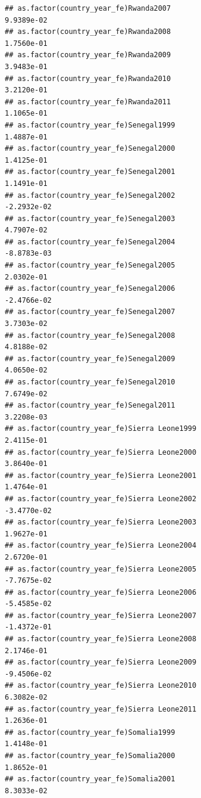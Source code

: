 \documentclass[
  a4paper,
]{article}
\begin{document}
\begin{verbatim}
## as.factor(country_year_fe)Rwanda2007                            9.9389e-02
## as.factor(country_year_fe)Rwanda2008                            1.7560e-01
## as.factor(country_year_fe)Rwanda2009                            3.9483e-01
## as.factor(country_year_fe)Rwanda2010                            3.2120e-01
## as.factor(country_year_fe)Rwanda2011                            1.1065e-01
## as.factor(country_year_fe)Senegal1999                           1.4887e-01
## as.factor(country_year_fe)Senegal2000                           1.4125e-01
## as.factor(country_year_fe)Senegal2001                           1.1491e-01
## as.factor(country_year_fe)Senegal2002                          -2.2932e-02
## as.factor(country_year_fe)Senegal2003                           4.7907e-02
## as.factor(country_year_fe)Senegal2004                          -8.8783e-03
## as.factor(country_year_fe)Senegal2005                           2.0302e-01
## as.factor(country_year_fe)Senegal2006                          -2.4766e-02
## as.factor(country_year_fe)Senegal2007                           3.7303e-02
## as.factor(country_year_fe)Senegal2008                           4.8188e-02
## as.factor(country_year_fe)Senegal2009                           4.0650e-02
## as.factor(country_year_fe)Senegal2010                           7.6749e-02
## as.factor(country_year_fe)Senegal2011                           3.2208e-03
## as.factor(country_year_fe)Sierra Leone1999                      2.4115e-01
## as.factor(country_year_fe)Sierra Leone2000                      3.8640e-01
## as.factor(country_year_fe)Sierra Leone2001                      1.4764e-01
## as.factor(country_year_fe)Sierra Leone2002                     -3.4770e-02
## as.factor(country_year_fe)Sierra Leone2003                      1.9627e-01
## as.factor(country_year_fe)Sierra Leone2004                      2.6720e-01
## as.factor(country_year_fe)Sierra Leone2005                     -7.7675e-02
## as.factor(country_year_fe)Sierra Leone2006                     -5.4585e-02
## as.factor(country_year_fe)Sierra Leone2007                     -1.4372e-01
## as.factor(country_year_fe)Sierra Leone2008                      2.1746e-01
## as.factor(country_year_fe)Sierra Leone2009                     -9.4506e-02
## as.factor(country_year_fe)Sierra Leone2010                      6.3082e-02
## as.factor(country_year_fe)Sierra Leone2011                      1.2636e-01
## as.factor(country_year_fe)Somalia1999                           1.4148e-01
## as.factor(country_year_fe)Somalia2000                           1.8652e-01
## as.factor(country_year_fe)Somalia2001                           8.3033e-02

\end{verbatim}
\end{document}
